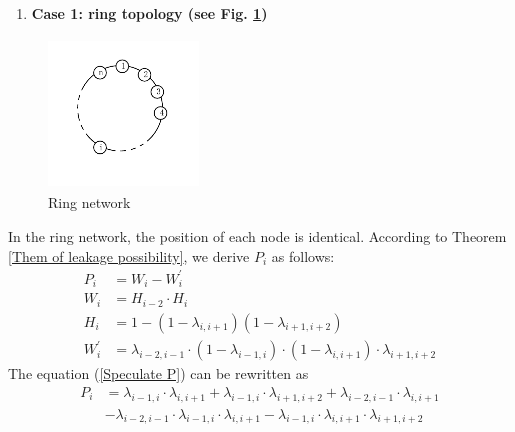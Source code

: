 \documentclass[10pt,journal,compsoc]{IEEEtran}
\begin{document}
\begin{enumerate}
\item \textbf{Case 1: ring topology (see Fig. \ref{fig2})}
\end{enumerate}
\begin{figure}[!htb]
 \centering
 \includegraphics[width=4cm, height=4cm]{ring}
 \caption{Ring network}
 \label{fig2}
\end{figure}
In the ring network, the position of each node is identical. According to Theorem \ref{Them of leakage possibility}, we derive $P_{i}$ as follows:
\begin{equation} \label{Speculate P}
\begin{split}
P_i&=W_{i}-W_{i}^{'}\\
W_{i}&= H_{i-2}\cdot H_{i}\\
H_{i}&=1-(1-\lambda_{i, i+1})(1-\lambda_{i+1, i+2})\\
W_{i}^{'}&=\lambda_{i-2, i-1}\cdot(1-\lambda_{i-1, i})\cdot(1-\lambda_{i, i+1})\cdot\lambda_{i+1, i+2}
\end{split}
\end{equation}
The equation (\ref{Speculate P}) can be rewritten as
\begin{equation}
\begin{split}
P_i&=\lambda_{i-1, i}\cdot\lambda_{i, i+1}+\lambda_{i-1, i}\cdot\lambda_{i+1, i+2}+\lambda_{i-2, i-1}\cdot\lambda_{i, i+1}\\
&-\lambda_{i-2, i-1}\cdot\lambda_{i-1, i}\cdot\lambda_{i, i+1}-\lambda_{i-1, i}\cdot\lambda_{i, i+1}\cdot\lambda_{i+1, i+2}
\end{split}
\end{equation}
\end{document}
